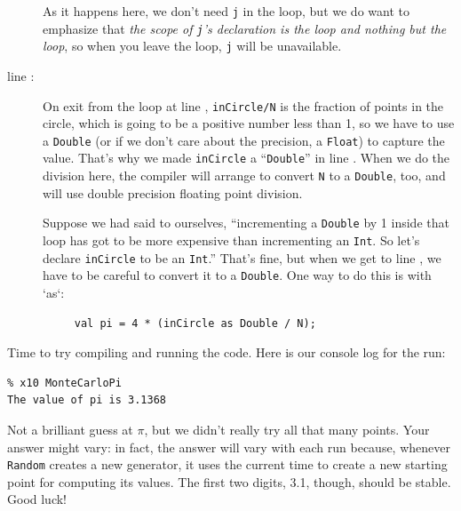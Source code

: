 \begin{description}
As it happens here, we don't need {\tt j} in the loop, but we do want to emphasize
that {\em the scope of {\tt j}'s declaration is the loop and nothing but the
loop}, so when you leave the loop, {\tt j} will be unavailable.  

\item[line  \xlref{mpi1-pi}{12}:]
On exit from the loop at line  , {\tt inCircle/N} is the fraction of points
in the circle, which is going to be a positive number less than 1, so we
have to use a {\tt Double} (or if we don't care about the precision, a {\tt Float})
to capture the value.  
That's why we made {\tt inCircle} a ``{\tt Double}'' in line  .
When we do the division here, the compiler will arrange to convert
{\tt N} to a {\tt Double}, too, and will use double precision floating
point division.  

Suppose we had said to ourselves, ``incrementing a {\tt Double} by 1 inside that
loop has got to
be more expensive than incrementing an {\tt Int}.  So let's declare {\tt inCircle} to be
an {\tt Int}.''  That's fine, but when we get to line , we have to be careful to
convert it to a {\tt Double}.  One way to do this is with \xcd`as`:
\begin{verbatim}
     val pi = 4 * (inCircle as Double / N);
\end{verbatim}
\end{description}

Time to try compiling and running the code.  Here is our console log for the
run:
\begin{verbatim}
% x10 MonteCarloPi
The value of pi is 3.1368
\end{verbatim}
Not a brilliant guess at $\pi$, but we didn't really try all that many points.  Your
answer might vary: in fact, the answer will vary with each run because, whenever
{\tt Random} creates a new generator, it
uses the current time to create a new starting point for computing its values.
The first two digits, 3.1, though, should be stable.  Good luck!

